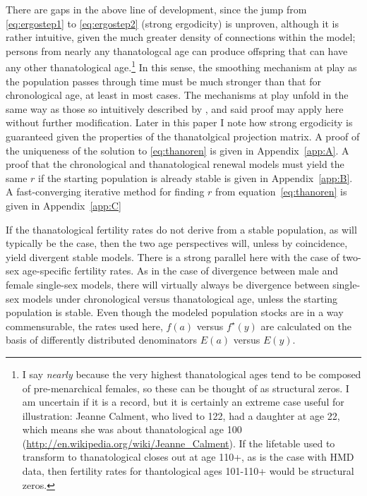 \documentclass{article}
\begin{document}
There are gaps in the above line of development, since the jump from
\eqref{eq:ergostep1} to \eqref{eq:ergostep2} (strong ergodicity) is unproven,
although it is rather intuitive, given the much greater density of connections
within the model; persons from nearly any thanatologcal age can produce offspring that can have any other thanatological age.\footnote{I say
\textit{nearly} because the very highest thanatological ages tend to be
composed of pre-menarchical females, so these can be thought of as structural
zeros. I am uncertain if it is a record, but it is certainly an extreme case
useful for illustration: Jeanne Calment, who lived to 122, had a daughter at age
22, which means she was about thanatological age 100
(\url{http://en.wikipedia.org/wiki/Jeanne_Calment}). If the lifetable used to
transform to thanatological closes out at age 110+, as is the case with HMD data, then fertility rates for thantological ages 101-110+ would be structural
zeros.} In
this sense, the smoothing mechanism at play as the population passes through
time must be much stronger than that for chronological age, at least in most
cases.  The mechanisms at play unfold in the same way as those so intuitively
described by \citet{arthur1982ergodic}, and said proof may apply here without
further modification. Later in this paper I note how strong ergodicity is
guaranteed given the properties of the thanatolgical projection matrix. A proof
of the uniqueness of the solution to \eqref{eq:thanoren} is given in
Appendix~\ref{app:A}. A proof that the chronological and thanatological renewal
models must yield the same $r$ if the starting population is already stable is
given in Appendix~\ref{app:B}. A fast-converging iterative method for finding
$r$ from equation~\eqref{eq:thanoren} is given in Appendix~\ref{app:C}

If the thanatological fertility rates do not derive from a stable
population, as will typically be the case, then the two age perspectives
will, unless by coincidence, yield divergent stable models. There is a strong
parallel here with the case of two-sex age-specific fertility rates. As in the
case of divergence between male and female single-sex models, there will
virtually always be divergence between single-sex models under chronological
versus thanatological age, unless the starting population is stable. Even though the modeled population stocks are in a way commensurable, the rates used here, $f(a)$ versus $f^\star(y)$ are calculated on the basis of differently distributed denominators $E(a)$ versus $E(y)$.
\end{document}
